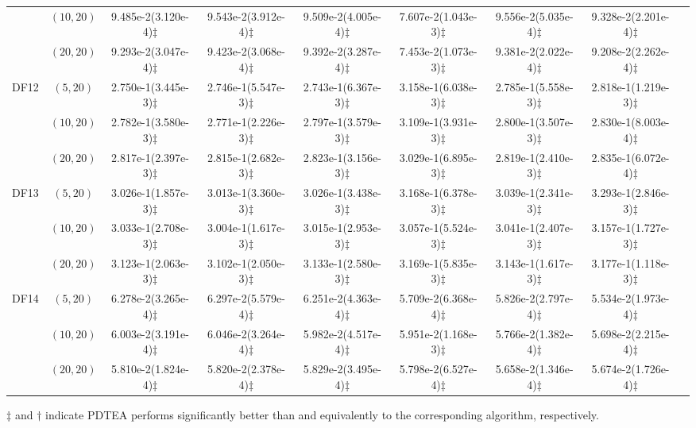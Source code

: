 \documentclass[review]{elsarticle}
\begin{document}
\begin{table*}[!tbh]
{{\begin{tabular} {ccccccccc}
&$(10,20)$ &9.485e-2(3.120e-4)$\ddagger$ &9.543e-2(3.912e-4)$\ddagger$ &9.509e-2(4.005e-4)$\ddagger$ &7.607e-2(1.043e-3)$\ddagger$ &9.556e-2(5.035e-4)$\ddagger$ &9.328e-2(2.201e-4)$\ddagger$ \\
&$(20,20)$ &9.293e-2(3.047e-4)$\ddagger$ &9.423e-2(3.068e-4)$\ddagger$ &9.392e-2(3.287e-4)$\ddagger$ &7.453e-2(1.073e-3)$\ddagger$ &9.381e-2(2.022e-4)$\ddagger$ &9.208e-2(2.262e-4)$\ddagger$ \\
\hline  \multirow{3}{*}{DF12}
&$(5,20)$ &2.750e-1(3.445e-3)$\ddagger$ &2.746e-1(5.547e-3)$\ddagger$ &2.743e-1(6.367e-3)$\ddagger$ &3.158e-1(6.038e-3)$\ddagger$ &2.785e-1(5.558e-3)$\ddagger$ &2.818e-1(1.219e-3)$\ddagger$ \\
&$(10,20)$ &2.782e-1(3.580e-3)$\ddagger$ &2.771e-1(2.226e-3)$\ddagger$ &2.797e-1(3.579e-3)$\ddagger$ &3.109e-1(3.931e-3)$\ddagger$ &2.800e-1(3.507e-3)$\ddagger$ &2.830e-1(8.003e-4)$\ddagger$ \\
&$(20,20)$ &2.817e-1(2.397e-3)$\ddagger$ &2.815e-1(2.682e-3)$\ddagger$ &2.823e-1(3.156e-3)$\ddagger$ &3.029e-1(6.895e-3)$\ddagger$ &2.819e-1(2.410e-3)$\ddagger$ &2.835e-1(6.072e-4)$\ddagger$ \\
\hline  \multirow{3}{*}{DF13}
&$(5,20)$ &3.026e-1(1.857e-3)$\ddagger$ &3.013e-1(3.360e-3)$\ddagger$ &3.026e-1(3.438e-3)$\ddagger$ &3.168e-1(6.378e-3)$\ddagger$ &3.039e-1(2.341e-3)$\ddagger$ &3.293e-1(2.846e-3)$\ddagger$ \\
&$(10,20)$ &3.033e-1(2.708e-3)$\ddagger$ &3.004e-1(1.617e-3)$\ddagger$ &3.015e-1(2.953e-3)$\ddagger$ &3.057e-1(5.524e-3)$\ddagger$ &3.041e-1(2.407e-3)$\ddagger$ &3.157e-1(1.727e-3)$\ddagger$ \\
&$(20,20)$ &3.123e-1(2.063e-3)$\ddagger$ &3.102e-1(2.050e-3)$\ddagger$ &3.133e-1(2.580e-3)$\ddagger$ &3.169e-1(5.835e-3)$\ddagger$ &3.143e-1(1.617e-3)$\ddagger$ &3.177e-1(1.118e-3)$\ddagger$ \\
\hline  \multirow{3}{*}{DF14}
&$(5,20)$ &6.278e-2(3.265e-4)$\ddagger$ &6.297e-2(5.579e-4)$\ddagger$ &6.251e-2(4.363e-4)$\ddagger$ &5.709e-2(6.368e-4)$\ddagger$ &5.826e-2(2.797e-4)$\ddagger$ &5.534e-2(1.973e-4)$\ddagger$ \\
&$(10,20)$ &6.003e-2(3.191e-4)$\ddagger$ &6.046e-2(3.264e-4)$\ddagger$ &5.982e-2(4.517e-4)$\ddagger$ &5.951e-2(1.168e-3)$\ddagger$ &5.766e-2(1.382e-4)$\ddagger$ &5.698e-2(2.215e-4)$\ddagger$ \\
&$(20,20)$ &5.810e-2(1.824e-4)$\ddagger$ &5.820e-2(2.378e-4)$\ddagger$ &5.829e-2(3.495e-4)$\ddagger$ &5.798e-2(6.527e-4)$\ddagger$ &5.658e-2(1.346e-4)$\ddagger$ &5.674e-2(1.726e-4)$\ddagger$ \\
\midrule
\bottomrule[1pt]
\end{tabular}}
}
\begin{tablenotes}
\item $\ddagger$ and $ \dagger$ indicate PDTEA performs significantly better than and equivalently to the corresponding algorithm, respectively.
\end{tablenotes}
\scriptsize
\end{table*}
\end{document}
